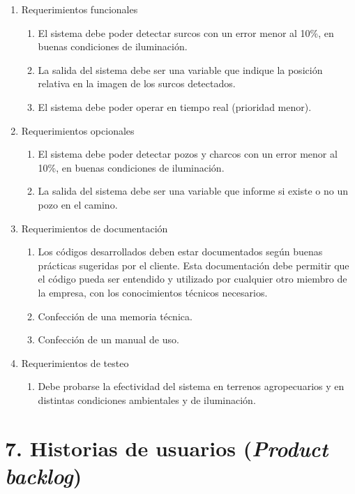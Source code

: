 \documentclass[
11pt, %
codirector, %
]{charter}
\begin{document}
\begin{enumerate}
	\item Requerimientos funcionales
		\begin{enumerate}
			\item El sistema debe poder detectar surcos con un error menor al 10\%, en buenas condiciones de iluminación.
			\item La salida del sistema debe ser una variable que indique la posición relativa en la imagen de los surcos detectados.
			\item El sistema debe poder operar en tiempo real (prioridad menor).
		\end{enumerate}
		
	\item Requerimientos opcionales
		\begin{enumerate}
			\item El sistema debe poder detectar pozos y charcos con un error menor al 10\%, en buenas condiciones de iluminación.
			\item La salida del sistema debe ser una variable que informe si existe o no un pozo en el camino.
		\end{enumerate}
	
	\item Requerimientos de documentación
		\begin{enumerate}
			\item Los códigos desarrollados deben estar documentados según buenas prácticas sugeridas por el cliente. Esta documentación debe permitir que el código pueda ser entendido y utilizado por cualquier otro miembro de la empresa, con los conocimientos técnicos necesarios.
			\item Confección de una memoria técnica.
			\item Confección de un manual de uso.
		\end{enumerate}
	\item Requerimientos de testeo
		\begin{enumerate}
			\item Debe probarse la efectividad del sistema en terrenos agropecuarios y en distintas condiciones ambientales y de iluminación.
		\end{enumerate}
\end{enumerate}


\section{7. Historias de usuarios (\textit{Product backlog})}
\label{sec:backlog}
\end{document}

